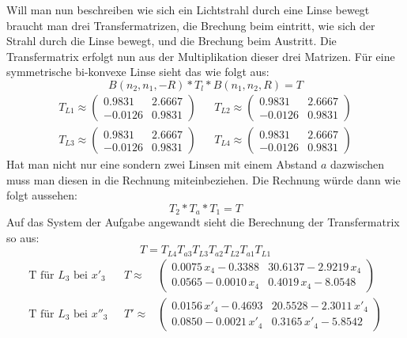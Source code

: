 \documentclass[11pt,twoside,a4paper]{article}
\begin{document}
	Will man nun beschreiben wie sich ein Lichtstrahl durch eine Linse bewegt braucht man drei Transfermatrizen, die Brechung beim eintritt, wie sich der Strahl durch die Linse bewegt, und die Brechung beim Austritt. Die Transfermatrix erfolgt nun aus der Multiplikation dieser drei Matrizen. Für eine symmetrische bi-konvexe Linse sieht das wie folgt aus: 
	\begin{equation*} \label{SymmLinse}
	B(n_{2},n_{1},-R)*T_{l}*B(n_{1},n_{2},R) = T
	\end{equation*}
	\begin{equation*}
	\begin{aligned}
	T_{L1} \approx
	\begin{pmatrix}
	0.9831 & 2.6667 \\
	-0.0126 & 0.9831
	\end{pmatrix} &
	&
	T_{L2} \approx
	\begin{pmatrix}
	0.9831 & 2.6667 \\
	-0.0126 & 0.9831
	\end{pmatrix} \\
	T_{L3} \approx
	\begin{pmatrix}
	0.9831 & 2.6667 \\
	-0.0126 & 0.9831
	\end{pmatrix}&
	&
	T_{L4} \approx
	\begin{pmatrix}
	0.9831 & 2.6667 \\
	-0.0126 & 0.9831
	\end{pmatrix}
	\end{aligned}
	\end{equation*}
	Hat man nicht nur eine sondern zwei Linsen mit einem Abstand \(a\) dazwischen muss man diesen in die Rechnung miteinbeziehen. Die Rechnung würde dann wie folgt aussehen: 
	\begin{equation} \label{SymmLinse}
	T_{2}*T_{a}*T_{1} = T
	\end{equation}
	Auf das System der Aufgabe angewandt sieht die Berechnung der Transfermatrix so aus: 
	\begin{equation} \label{TLinsSys}
	T = T_{L4}T_{a3}T_{L3}T_{a2}T_{L2}T_{a1}T_{L1}
	\end{equation}
	\begin{equation*}
	\begin{aligned}
	\textrm{T für \(L_{3}\) bei \(x'_{3}\) } & T \approx
	&
	\begin{pmatrix}
	0.0075\,x_4 -0.3388 & 30.6137-2.9219\,x_4 \\
	0.0565-0.0010\,x_4  & 0.4019\,x_4 -8.0548
	\end{pmatrix}\\
	\textrm{T für \(L_{3}\) bei \(x''_{3}\) } & T' \approx
	&
	\begin{pmatrix}
	0.0156\,x'_4 -0.4693 & 20.5528-2.3011\,x'_4 \\
	0.0850-0.0021\,x'_4  & 0.3165\,x'_4 -5.8542
	\end{pmatrix}
	\end{aligned}
	\end{equation*}
\end{document}
